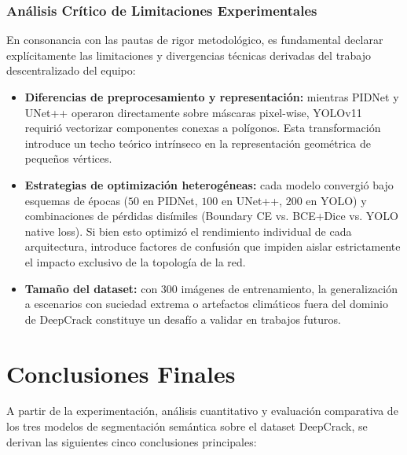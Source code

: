 \documentclass[conference]{IEEEtran}
\begin{document}
\subsubsection{Análisis Crítico de Limitaciones Experimentales}
En consonancia con las pautas de rigor metodológico, es fundamental declarar explícitamente las limitaciones y divergencias técnicas derivadas del trabajo descentralizado del equipo:
\begin{itemize}
    \item \textbf{Diferencias de preprocesamiento y representación:} mientras PIDNet y UNet++ operaron directamente sobre máscaras pixel-wise, YOLOv11 requirió vectorizar componentes conexas a polígonos. Esta transformación introduce un techo teórico intrínseco en la representación geométrica de pequeños vértices.
    \item \textbf{Estrategias de optimización heterogéneas:} cada modelo convergió bajo esquemas de épocas ($50$ en PIDNet, $100$ en UNet++, $200$ en YOLO) y combinaciones de pérdidas disímiles (Boundary CE vs. BCE+Dice vs. YOLO native loss). Si bien esto optimizó el rendimiento individual de cada arquitectura, introduce factores de confusión que impiden aislar estrictamente el impacto exclusivo de la topología de la red.
    \item \textbf{Tamaño del dataset:} con 300 imágenes de entrenamiento, la generalización a escenarios con suciedad extrema o artefactos climáticos fuera del dominio de DeepCrack constituye un desafío a validar en trabajos futuros.
\end{itemize}

\section{Conclusiones Finales}

A partir de la experimentación, análisis cuantitativo y evaluación comparativa de los tres modelos de segmentación semántica sobre el dataset DeepCrack, se derivan las siguientes cinco conclusiones principales:
\end{document}
